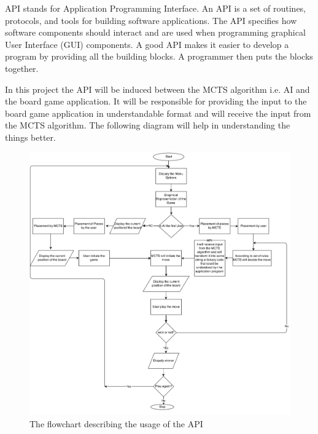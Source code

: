 API stands for Application Programming Interface. An API is a set of routines, protocols, and tools for building software applications. The API specifies how software components should interact and are used when programming graphical User Interface (GUI) components. A good API makes it easier to develop a program by providing all the building blocks. A programmer then puts the blocks together.

In this project the API will be induced between the MCTS algorithm i.e. AI and the board game application. It will be responsible for providing the input to the board game application in understandable format and will receive the input from the MCTS algorithm. The following diagram will help in understanding the things better.
\bigbreak

\begin{figure}[H]
	\centering
	\includegraphics[width=\textwidth]{2General_Architecture/2.2API/img/DiagramAPI.png}
	\caption{The flowchart describing the usage of the API}
	\label{fig:flowchart}
\end{figure}


